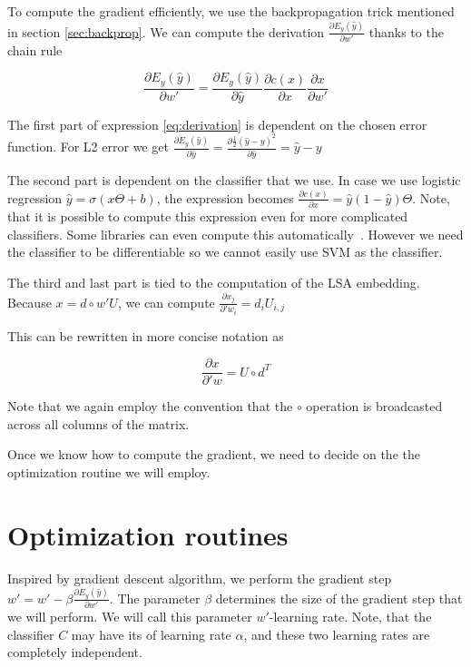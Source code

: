     To compute the gradient efficiently, we use the backpropagation trick mentioned in section \ref{sec:backprop}.
    We can compute the derivation $\frac{\partial E_y(\hat{y})}{\partial w'}$ thanks to the chain rule
    
    \begin{equation} \label{eq:derivation}
    \frac{\partial E_y(\hat{y})}{\partial w'} = \frac{\partial E_y(\hat{y})}{\partial \hat{y}} \frac{\partial c(x)}{\partial x} \frac{\partial x}{\partial w'}
    \end{equation}
    
    The first part of expression \ref{eq:derivation} is dependent on the chosen error function. 
    For L2 error we get 
    $\frac{\partial E_y(\hat{y})}{\partial \hat{y}} = \frac{\partial \frac{1}{2}(\hat{y}-y)^2}{\partial \hat{y}} = \hat{y}-y$
    
    The second part is dependent on the classifier that we use. 
    In case we use logistic regression $\hat{y} = \sigma(x \Theta + b)$, the expression becomes
    $\frac{\partial c(x)}{\partial x} = \hat{y} (1-\hat{y}) \Theta$.
    Note, that it is possible to compute this expression even for more complicated classifiers. 
    Some libraries can even compute this automatically~\cite{tensorflow2015-whitepaper}.
    However we need the classifier to be differentiable so we cannot easily use SVM as the classifier. 
    
    The third and last part is tied to the computation of the LSA embedding.
    Because $x = d \circ w' U$, we can compute 
    $\frac{\partial x_j}{\partial 'w_i} = d_i U_{i,j}$
    
    This can be rewritten in more concise notation as 
    
    $$\frac{\partial x}{\partial 'w} = U \circ d^T$$
    
    Note that we again employ the convention that the $\circ$ operation is broadcasted across all columns of the matrix.

    Once we know how to compute the gradient, we need to decide on the the optimization routine we will employ.

\section{Optimization routines}
    
    Inspired by gradient descent algorithm, we perform the gradient step $w' = w' - \beta \frac{\partial E_y(\hat{y})}{\partial w'}$. 
    The parameter $\beta$ determines the size of the gradient step that we will perform.
    We will call this parameter $w'$-learning rate. 
    Note, that the classifier $C$ may have its of learning rate $\alpha$, and these two learning rates are completely independent.
    
